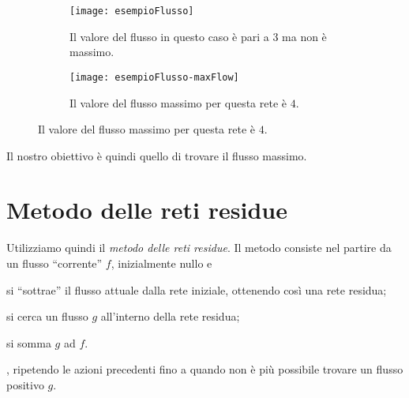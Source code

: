 \begin{comment}
\begin{minipage}[t]{.45\linewidth}\centering
	\begin{figure}[H]
		\centering
		\texttt{[image: esempioFlusso]}
		\caption{Il valore del flusso in questo caso è pari a \(3\) ma non è massimo}%
		\label{gif:valore-flusso}
	\end{figure}
\end{minipage}\hfill
\begin{minipage}[t]{.45\linewidth}\centering
	\begin{figure}[H]
		\centering
		\texttt{[image: esempioFlusso-maxFlow]}
		\caption{Il valore del flusso massimo per questa rete è \(4\)}
		\label{gif:flusso-massimo}
	\end{figure}
\end{minipage}
\end{comment}

\begin{figure}[H]
	\begin{subfigure}[t]{0.475\textwidth}\centering
		\texttt{[image: esempioFlusso]}
		\caption{Il valore del flusso in questo caso è pari a \(3\) ma non è massimo.}
		\label{gif:valore-flusso}
	\end{subfigure}\hfill
	\begin{subfigure}[t]{0.475\textwidth}\centering
		\texttt{[image: esempioFlusso-maxFlow]}
		\caption{Il valore del flusso massimo per questa rete è \(4\).}
		\label{gif:flusso-massimo}
	\end{subfigure}
\end{figure}

\begin{note}
Il nostro obiettivo è quindi quello di trovare il flusso massimo.
\end{note}

\section{Metodo delle reti residue}

Utilizziamo quindi il \emph{metodo delle reti residue}.
Il metodo consiste nel partire da un flusso \enquote{corrente} \(f\), inizialmente nullo e
\begin{enumerate*}[label=\arabic*)]
	\item si \enquote{sottrae} il flusso attuale dalla rete iniziale, ottenendo così una rete residua;
	\item si cerca un flusso \(g\) all'interno della rete residua;
	\item si somma \(g\) ad \(f\).
\end{enumerate*}, ripetendo le azioni precedenti fino a quando non è più possibile trovare un flusso positivo \(g\).

